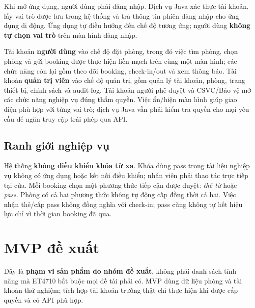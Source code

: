 \documentclass[12pt,a4paper]{article}
\begin{document}
Khi mở ứng dụng, người dùng phải đăng nhập. Dịch vụ Java xác thực tài khoản, lấy vai trò được lưu trong hệ thống và trả thông tin phiên đăng nhập cho ứng dụng di động. Ứng dụng tự điều hướng đến chế độ tương ứng; người dùng \textbf{không tự chọn vai trò} trên màn hình đăng nhập.

Tài khoản \textbf{người dùng} vào chế độ đặt phòng, trong đó việc tìm phòng, chọn phòng và gửi booking được thực hiện liền mạch trên cùng một màn hình; các chức năng còn lại gồm theo dõi booking, check-in/out và xem thông báo. Tài khoản \textbf{quản trị viên} vào chế độ quản trị, gồm quản lý tài khoản, phòng, trang thiết bị, chính sách và audit log. Tài khoản người phê duyệt và CSVC/Bảo vệ mở các chức năng nghiệp vụ đúng thẩm quyền. Việc ẩn/hiện màn hình giúp giao diện phù hợp với từng vai trò; dịch vụ Java vẫn phải kiểm tra quyền cho mọi yêu cầu để ngăn truy cập trái phép qua API.

\subsection{Ranh giới nghiệp vụ}

Hệ thống \textbf{không điều khiển khóa từ xa}. Khóa dùng pass trong tài liệu nghiệp vụ không có ứng dụng hoặc kết nối điều khiển; nhân viên phải thao tác trực tiếp tại cửa. Mỗi booking chọn một phương thức tiếp cận được duyệt: \emph{thẻ từ} hoặc \emph{pass}. Phòng có cả hai phương thức không tự động cấp đồng thời cả hai. Việc nhận thẻ/cấp pass không đồng nghĩa với check-in; pass cũng không tự hết hiệu lực chỉ vì thời gian booking đã qua.

\section{MVP đề xuất}

Đây là \textbf{phạm vi sản phẩm do nhóm đề xuất}, không phải danh sách tính năng mà ET4710 bắt buộc mọi đề tài phải có. MVP dùng dữ liệu phòng và tài khoản thử nghiệm; tích hợp tài khoản trường thật chỉ thực hiện khi được cấp quyền và có API phù hợp.
\end{document}
